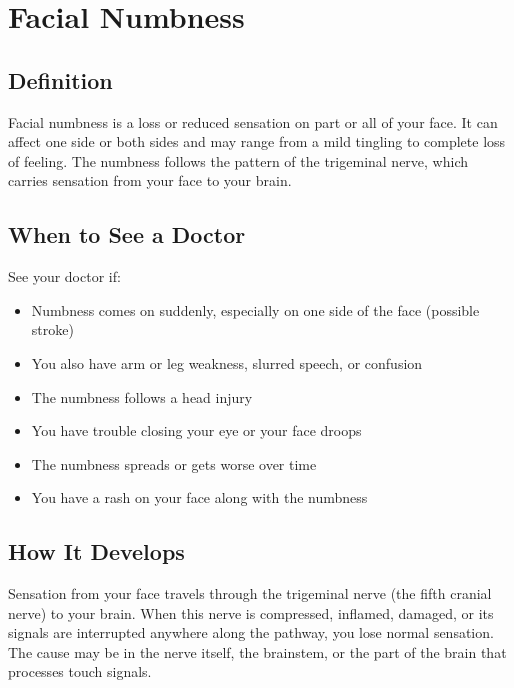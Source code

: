 \chapter{Facial Numbness}

\section*{Definition}
Facial numbness is a loss or reduced sensation on part or all of your face. It can affect one side or both sides and may range from a mild tingling to complete loss of feeling. The numbness follows the pattern of the trigeminal nerve, which carries sensation from your face to your brain.

\section*{When to See a Doctor}
See your doctor if:
\begin{itemize}
  \item Numbness comes on suddenly, especially on one side of the face (possible stroke)
  \item You also have arm or leg weakness, slurred speech, or confusion
  \item The numbness follows a head injury
  \item You have trouble closing your eye or your face droops
  \item The numbness spreads or gets worse over time
  \item You have a rash on your face along with the numbness
\end{itemize}

\section*{How It Develops}
Sensation from your face travels through the trigeminal nerve (the fifth cranial nerve) to your brain. When this nerve is compressed, inflamed, damaged, or its signals are interrupted anywhere along the pathway, you lose normal sensation. The cause may be in the nerve itself, the brainstem, or the part of the brain that processes touch signals.


